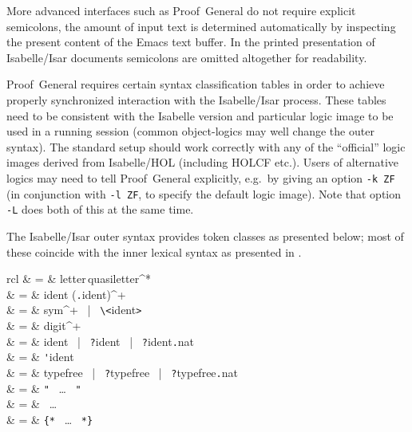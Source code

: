 \begin{isabellebody}
\begin{isamarkuptext}
  More advanced interfaces such as Proof~General \cite{proofgeneral}
  do not require explicit semicolons, the amount of input text is
  determined automatically by inspecting the present content of the
  Emacs text buffer.  In the printed presentation of Isabelle/Isar
  documents semicolons are omitted altogether for readability.

  \begin{warn}
    Proof~General requires certain syntax classification tables in
    order to achieve properly synchronized interaction with the
    Isabelle/Isar process.  These tables need to be consistent with
    the Isabelle version and particular logic image to be used in a
    running session (common object-logics may well change the outer
    syntax).  The standard setup should work correctly with any of the
    ``official'' logic images derived from Isabelle/HOL (including
    HOLCF etc.).  Users of alternative logics may need to tell
    Proof~General explicitly, e.g.\ by giving an option \verb|-k ZF|
    (in conjunction with \verb|-l ZF|, to specify the default
    logic image).  Note that option \verb|-L| does both
    of this at the same time.
  \end{warn}%
\end{isamarkuptext}%
\isamarkuptrue%
%
\isamarkuptrue%
%
\begin{isamarkuptext}%
The Isabelle/Isar outer syntax provides token classes as presented
  below; most of these coincide with the inner lexical syntax as
  presented in \cite{isabelle-ref}.

  \begin{matharray}{rcl}
    \mbox{} & = & letter\,quasiletter^* \\
    \mbox{} & = & ident (\verb,.,ident)^+ \\
    \mbox{} & = & sym^+ ~|~ \verb,\,\verb,<,ident\verb,>, \\
    \mbox{} & = & digit^+ \\
    \mbox{} & = & ident ~|~ \verb,?,ident ~|~ \verb,?,ident\verb,.,nat \\
    \mbox{} & = & \verb,',ident \\
    \mbox{} & = & typefree ~|~ \verb,?,typefree ~|~ \verb,?,typefree\verb,.,nat \\
    \mbox{} & = & \verb,", ~\dots~ \verb,", \\
    \mbox{} & = & \backquote ~\dots~ \backquote \\
    \mbox{} & = & \verb,{*, ~\dots~ \verb,*,\verb,}, \\[1ex]


\end{matharray}
\end{isamarkuptext}
\end{isabellebody}

